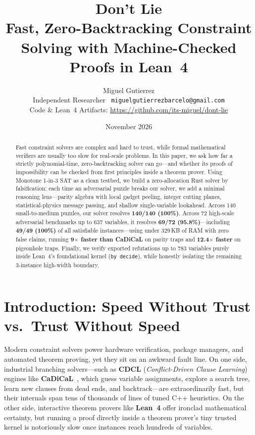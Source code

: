 \documentclass[11pt]{article}
\title{\textbf{\LARGE Don't Lie}\\[5pt]
{\large Fast, Zero-Backtracking Constraint Solving with Machine-Checked Proofs in Lean~4}}
\author{Miguel Gutierrez\\
\small Independent Researcher \textbar\ \texttt{miguelgutierrezbarcelo@gmail.com}\\
\small Code \& Lean~4 Artifacts: \url{https://github.com/its-miguel/dont-lie}}
\date{November 2026}
\begin{document}
\maketitle

\begin{abstract}
Fast constraint solvers are complex and hard to trust, while formal mathematical verifiers are usually too slow for real-scale problems. In this paper, we ask how far a strictly polynomial-time, zero-backtracking solver can go---and whether its proofs of impossibility can be checked from first principles inside a theorem prover. Using Monotone 1-in-3 SAT as a clean testbed, we build a zero-allocation Rust solver by falsification: each time an adversarial puzzle breaks our solver, we add a minimal reasoning lens---parity algebra with local gadget peeling, integer cutting planes, statistical-physics message passing, and shallow single-variable lookahead. Across 140 small-to-medium puzzles, our solver resolves \textbf{140/140 (100\%)}. Across 72 high-scale adversarial benchmarks up to 637 variables, it resolves \textbf{69/72 (95.8\%)}---including \textbf{49/49 (100\%)} of all satisfiable instances---using under 329\,KB of RAM with zero false claims, running \textbf{9$\times$ faster than CaDiCaL} on parity traps and \textbf{12.4$\times$ faster} on pigeonhole traps. Finally, we verify exported refutations up to 783 variables purely inside Lean~4's foundational kernel (\texttt{by decide}), while honestly isolating the remaining 3-instance high-width boundary.
\end{abstract}

\section{Introduction: Speed Without Trust vs.\ Trust Without Speed}

Modern constraint solvers power hardware verification, package managers, and automated theorem proving, yet they sit on an awkward fault line. On one side, industrial branching solvers---such as \textbf{CDCL} (\emph{Conflict-Driven Clause Learning}) engines like \textbf{CaDiCaL}~\cite{biere2024cadical}, which guess variable assignments, explore a search tree, learn new clauses from dead ends, and backtrack---are extraordinarily fast, but their internals span tens of thousands of lines of tuned C++ heuristics. On the other side, interactive theorem provers like \textbf{Lean~4} offer ironclad mathematical certainty, but running a proof directly inside a theorem prover's tiny trusted kernel is notoriously slow once instances reach hundreds of variables.
\end{document}
